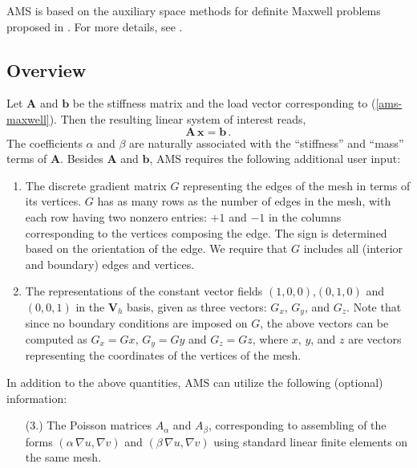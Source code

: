 AMS is based on the auxiliary space methods for definite Maxwell
problems proposed in \cite{xu_H_curl}.
For more details, see \cite{ams_jcm}.

\subsection{Overview}
Let ${\mathbf A}$ and ${\mathbf b}$ be the stiffness matrix and  the
load vector corresponding to (\ref{ams-maxwell}). Then the resulting
linear system of interest reads,
\begin{equation} \label{ams-maxwell-ls}
{\mathbf A}\, {\mathbf x} = {\mathbf b} \,.
\end{equation}
The coefficients $\alpha$ and $\beta$ are naturally associated with
the ``stiffness'' and ``mass'' terms of ${\mathbf A}$.
Besides ${\mathbf A}$ and ${\mathbf b}$, AMS requires the following
additional user input:
\begin{enumerate}
\item The discrete gradient matrix $G$ representing the edges of
the mesh in terms of its vertices. $G$ has as many rows as the number
of edges in the mesh, with each row having two nonzero entries:
$+1$ and $-1$ in the columns corresponding to the vertices composing
the edge. The sign is determined based on the orientation of the edge.
We require that $G$ includes all (interior and boundary) edges
and vertices.

\item The representations of the constant vector fields $(1,0,0)$,$(0,1,0)$ and
$(0,0,1)$ in the ${\mathbf V}_h$ basis, given as three vectors: $G_x$, $G_y$, and $G_z$.
Note that since no boundary conditions are imposed on $G$, the above vectors
can be computed as $G_x = G x$, $G_y = G y$ and $G_z = G z$, where
$x$, $y$, and $z$ are vectors representing the coordinates of the vertices of the mesh.
\end{enumerate}

In addition to the above quantities, AMS can utilize
the following (optional) information:
\begin{enumerate}
\item[(3.)] The Poisson matrices $A_\alpha$ and $A_\beta$, corresponding to
assembling of the forms $(\alpha\, \nabla u, \nabla v)$
and $(\beta\, \nabla u, \nabla v)$ using standard linear finite elements on
the same mesh.
\end{enumerate}

